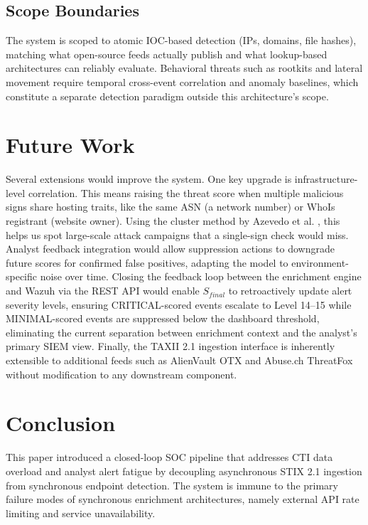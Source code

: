 \documentclass[conference]{IEEEtran}
\begin{document}
\subsection{Scope Boundaries}
The system is scoped to atomic IOC-based detection (IPs, domains, file hashes), matching what open-source feeds actually publish and what lookup-based architectures can reliably evaluate. Behavioral threats such as rootkits and lateral movement require temporal cross-event correlation and anomaly baselines, which constitute a separate detection paradigm outside this architecture's scope.

\section{Future Work}

Several extensions would improve the system. One key upgrade is infrastructure-level correlation. This means raising the threat score when multiple malicious signs share hosting traits, like the same ASN (a network number) or WhoIs registrant (website owner). Using the cluster method by Azevedo et al. \cite{azevedo}, this helps us spot large-scale attack campaigns that a single-sign check would miss. Analyst feedback integration would allow suppression actions to downgrade future scores for confirmed false positives, adapting the model to environment-specific noise over time. Closing the feedback loop between the enrichment engine and Wazuh via the REST API would enable $S_{final}$ to retroactively update alert severity levels, ensuring CRITICAL-scored events escalate to Level 14--15 while MINIMAL-scored events are suppressed below the dashboard threshold, eliminating the current separation between enrichment context and the analyst's primary SIEM view. Finally, the TAXII 2.1 ingestion interface is inherently extensible to additional feeds such as AlienVault OTX and Abuse.ch ThreatFox without modification to any downstream component.

\section{Conclusion}
This paper introduced a closed-loop SOC pipeline that addresses CTI data overload and analyst alert fatigue by decoupling asynchronous STIX 2.1 ingestion from synchronous endpoint detection. The system is immune to the primary failure modes of synchronous enrichment architectures, namely external API rate limiting and service unavailability.
\end{document}

